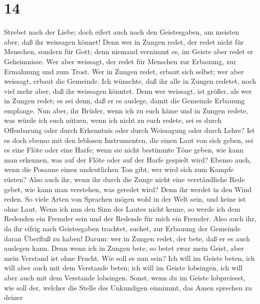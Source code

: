 \hypertarget{section-13}{%
\section{14}\label{section-13}}

 Strebet nach der Liebe; doch eifert auch nach den
Geistesgaben, am meisten aber, daß ihr weissagen könnet! 
Denn wer in Zungen redet, der redet nicht für Menschen, sondern für
Gott; denn niemand vernimmt es, im Geiste aber redet er Geheimnisse.
 Wer aber weissagt, der redet für Menschen zur Erbauung,
zur Ermahnung und zum Trost.  Wer in Zungen redet, erbaut
sich selbst; wer aber weissagt, erbaut die Gemeinde.  Ich
wünschte, daß ihr alle in Zungen redetet, noch viel mehr aber, daß ihr
weissagen könntet. Denn wer weissagt, ist größer, als wer in Zungen
redet; es sei denn, daß er es auslege, damit die Gemeinde Erbauung
empfange.  Nun aber, ihr Brüder, wenn ich zu euch käme und
in Zungen redete, was würde ich euch nützen, wenn ich nicht zu euch
redete, sei es durch Offenbarung oder durch Erkenntnis oder durch
Weissagung oder durch Lehre?  Ist es doch ebenso mit den
leblosen Instrumenten, die einen Laut von sich geben, sei es eine Flöte
oder eine Harfe; wenn sie nicht bestimmte Töne geben, wie kann man
erkennen, was auf der Flöte oder auf der Harfe gespielt wird?
 Ebenso auch, wenn die Posaune einen undeutlichen Ton
gibt, wer wird sich zum Kampfe rüsten?  Also auch ihr,
wenn ihr durch die Zunge nicht eine verständliche Rede gebet, wie kann
man verstehen, was geredet wird? Denn ihr werdet in den Wind reden.
 So viele Arten von Sprachen mögen wohl in der Welt sein,
und keine ist ohne Laut.  Wenn ich nun den Sinn des
Lautes nicht kenne, so werde ich dem Redenden ein Fremder sein und der
Redende für mich ein Fremder.  Also auch ihr, da ihr
eifrig nach Geistesgaben trachtet, suchet, zur Erbauung der Gemeinde
daran Überfluß zu haben!  Darum: wer in Zungen redet, der
bete, daß er es auch auslegen kann.  Denn wenn ich in
Zungen bete, so betet zwar mein Geist, aber mein Verstand ist ohne
Frucht.  Wie soll es nun sein? Ich will im Geiste beten,
ich will aber auch mit dem Verstande beten; ich will im Geiste
lobsingen, ich will aber auch mit dem Verstande lobsingen.
 Sonst, wenn du im Geiste lobpreisest, wie soll der,
welcher die Stelle des Unkundigen einnimmt, das Amen sprechen zu deiner
